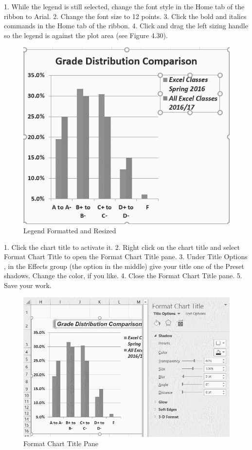 1.   While the legend is still selected, change the font style in the Home tab of the ribbon to Arial.
2.   Change the font size to 12 points.
3.   Click the bold and italics commands in the Home tab of the ribbon.
4.   Click and drag the left sizing handle so the legend is against the plot area (see Figure 4.30).



\begin{figure}[H]
	\centering
	\includegraphics[width=\maxwidth{.95\linewidth}]{gfx/ch04_fig31}
	\caption{Legend Formatted and Resized}
	\label{04:fig31}
\end{figure}





1. Click the chart title to activate it.
2. Right click on the chart title and select Format Chart Title to open the Format Chart Title
pane.
3. Under Title Options , in the Effects group (the option in the middle) give your title one of the
Preset shadows. Change the color, if you like.
4. Close the Format Chart Title pane.
5. Save your work.



\begin{figure}[H]
	\centering
	\includegraphics[width=\maxwidth{.95\linewidth}]{gfx/ch04_fig32}
	\caption{Format Chart Title Pane}
	\label{04:fig32}
\end{figure}

